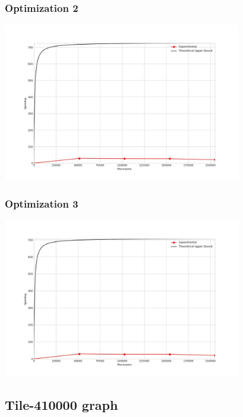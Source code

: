 \subsubsection{Optimization 2}
\begin{center}
    \resizebox{0.8\textwidth}{!}{}
    \includegraphics[width=0.78\textwidth]{../img/speedup-graph_type-tile-205000-O2}
\end{center}

\subsubsection{Optimization 3}
\begin{center}
    \resizebox{0.8\textwidth}{!}{}
    \includegraphics[width=0.78\textwidth]{../img/speedup-graph_type-tile-205000-O3}
\end{center}

\clearpage
\subsection{Tile-410000 graph}
